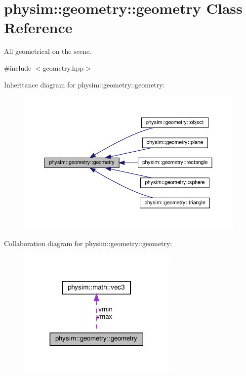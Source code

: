 \hypertarget{classphysim_1_1geometry_1_1geometry}{}\section{physim\+:\+:geometry\+:\+:geometry Class Reference}
\label{classphysim_1_1geometry_1_1geometry}


All geometrical on the scene.  




{\ttfamily \#include $<$geometry.\+hpp$>$}



Inheritance diagram for physim\+:\+:geometry\+:\+:geometry\+:\nopagebreak
\begin{figure}[H]
\begin{center}
\leavevmode
\includegraphics[width=350pt]{classphysim_1_1geometry_1_1geometry__inherit__graph}
\end{center}
\end{figure}


Collaboration diagram for physim\+:\+:geometry\+:\+:geometry\+:
\nopagebreak
\begin{figure}[H]
\begin{center}
\leavevmode
\includegraphics[width=221pt]{classphysim_1_1geometry_1_1geometry__coll__graph}
\end{center}
\end{figure}
